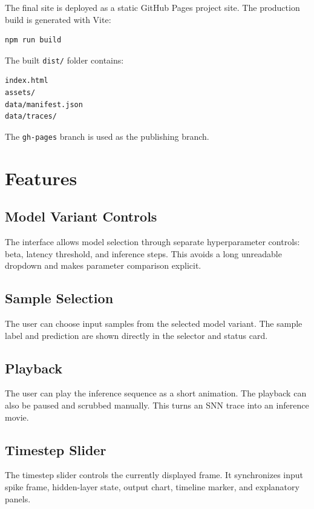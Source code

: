 \documentclass[11pt,a4paper]{article}
\begin{document}
The final site is deployed as a static GitHub Pages project site. The production build is generated with Vite:

\begin{lstlisting}
npm run build
\end{lstlisting}

The built \texttt{dist/} folder contains:

\begin{lstlisting}
index.html
assets/
data/manifest.json
data/traces/
\end{lstlisting}

The \texttt{gh-pages} branch is used as the publishing branch.

\section{Features}

\subsection{Model Variant Controls}

The interface allows model selection through separate hyperparameter controls: beta, latency threshold, and inference steps. This avoids a long unreadable dropdown and makes parameter comparison explicit.

\subsection{Sample Selection}

The user can choose input samples from the selected model variant. The sample label and prediction are shown directly in the selector and status card.

\subsection{Playback}

The user can play the inference sequence as a short animation. The playback can also be paused and scrubbed manually. This turns an SNN trace into an inference movie.

\subsection{Timestep Slider}

The timestep slider controls the currently displayed frame. It synchronizes input spike frame, hidden-layer state, output chart, timeline marker, and explanatory panels.
\end{document}
